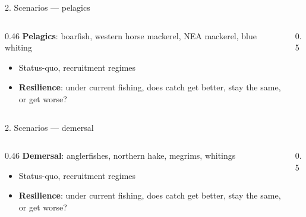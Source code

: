 \documentclass[12pt,aspectratio=169]{beamer}
\begin{document}
\begin{frame}{2. Scenarios --- pelagics}
  \begin{columns}[T]
    \begin{column}{0.46\textwidth}
      \textbf{Pelagics}: boarfish, western horse mackerel, NEA mackerel, blue whiting
      \begin{itemize}
        \item Status-quo, recruitment regimes
        \item \textbf{Resilience}: under current fishing, does catch get better, stay the same, or get worse?
      \end{itemize}
    \end{column}
    \begin{column}{0.5\textwidth}
      \centering
      \\
    \end{column}
  \end{columns}
\end{frame}

\begin{frame}{2. Scenarios --- demersal}
  \begin{columns}[T]
    \begin{column}{0.46\textwidth}
      \textbf{Demersal}: anglerfishes, northern hake, megrims, whitings
      \begin{itemize}
        \item Status-quo, recruitment regimes
        \item \textbf{Resilience}: under current fishing, does catch get better, stay the same, or get worse?
      \end{itemize}
    \end{column}
    \begin{column}{0.5\textwidth}
      \centering
      \\
    \end{column}
  \end{columns}
\end{frame}
\end{document}
